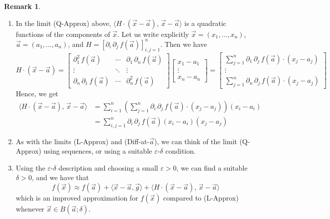 \documentclass[11pt]{article}
\theoremstyle{definition}
\newtheorem{remark}[thm]{Remark}
\begin{document}
\begin{remark}~
\vspace{-1.5ex}\begin{enumerate}[(1)]
\item In the limit (Q-Approx) above, $\langle H \cdot (\vec{x} - \vec{a}),\, \vec{x} - \vec{a} \rangle$ is a quadratic functions of the components of $\vec{x}$. Let us write explicitly $\vec{x} = (x_1, \dots, x_n)$, $\vec{a} = (a_1, \dots, a_n)$, and $H = [\partial_i\,\partial_j\,f(\vec{a})]_{i,j=1}^n$. Then we have
$$H \cdot (\vec{x} - \vec{a}) = \begin{bmatrix} \partial_1^2\,f(\vec{a}) & \cdots & \partial_1\,\partial_n\,f(\vec{a}) \\ \vdots & \ddots & \vdots \\ \partial_n\,\partial_1\,f(\vec{a}) & \cdots & \partial_n^2\,f(\vec{a}) \end{bmatrix} \begin{bmatrix} x_1 - a_1 \\ \vdots \\ x_n - a_n \end{bmatrix} = \begin{bmatrix} \sum_{j=1}^n \partial_1\,\partial_j\,f(\vec{a}) \cdot (x_j - a_j) \\ \vdots \\ \sum_{j=1}^n \partial_n \, \partial_j \, f(\vec{a}) \cdot (x_j - a_j) \end{bmatrix}$$
Hence, we get
\begin{align*}
\langle H \cdot (\vec{x} - \vec{a}),\, \vec{x} - \vec{a} \rangle 
&= \sum_{i=1}^n \left(\sum_{j=1}^n \partial_i\,\partial_j\,f(\vec{a}) \cdot (x_j - a_j)\right)(x_i - a_i) \\
&= \sum_{i,j=1}^n \partial_i\,\partial_j\,f(\vec{a})(x_i - a_i)(x_j - a_j)
\end{align*}
\item As with the limits (L-Approx) and (Diff-at-$\vec{a}$), we can think of the limit (Q-Approx) using sequences, or using a suitable $\varepsilon$-$\delta$ condition.
\item Using the $\varepsilon$-$\delta$ description and choosing a small $\varepsilon > 0$, we can find a suitable $\delta > 0$, and we have that
$$f(\vec{x}) \approx f(\vec{a}) + \langle \vec{x} - \vec{a}, \vec{g} \rangle + \langle H \cdot (\vec{x} - \vec{a}),\, \vec{x} - \vec{a} \rangle$$
which is an improved approximation for $f(\vec{x})$ compared to (L-Approx) whenever $\vec{x} \in B(\vec{a}; \delta)$.
\end{enumerate}\vspace{-1.5ex}
\end{remark}
\end{document}
